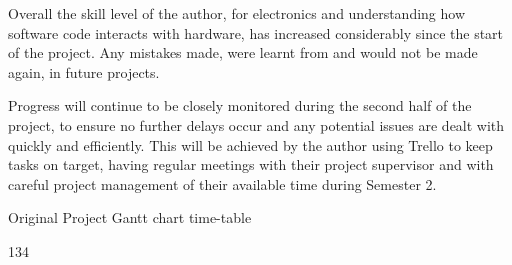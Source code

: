 \documentclass[progress]{cmpreport}
\begin{document}
Overall the skill level of the author, for electronics and understanding how software code interacts with hardware, has increased considerably since the start of the project. Any mistakes made, were learnt from and would not be made again, in future projects.

Progress will continue to be closely monitored during the second half of the project, to ensure no further delays occur and any potential issues are dealt with quickly and efficiently. This will be achieved by the author using Trello to keep tasks on target, having regular meetings with their project supervisor and with careful project management of their available time during Semester 2.

   \begin{cmpfigure}{Original Project Gantt chart time-table\label{pplan}}
 	\centering
 	\begin{sideways}
 		
 		\begin{ganttchart}[x unit=0.45cm, vgrid, title label font=\scriptsize,canvas/.style={draw=black, dotted}]{1}{34}
 			 \\
 			\\
 			\\
 			
 			
 			 \\ %
 			 \\ %
 			 \\ %
 			\\ %
 			 \\ 
 			\\ %
 			
 			\\
 			

\end{ganttchart}
\end{sideways}
\end{cmpfigure}
\end{document}

